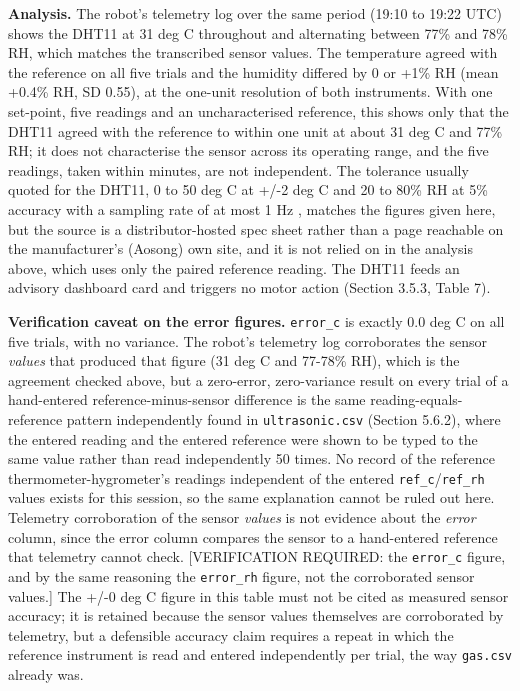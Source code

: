 \textbf{Analysis.} The robot's telemetry log over the same period (19:10 to 19:22 UTC) shows the DHT11 at 31 deg C throughout and alternating between 77\% and 78\% RH, which matches the transcribed sensor values. The temperature agreed with the reference on all five trials and the humidity differed by 0 or +1\% RH (mean +0.4\% RH, SD 0.55), at the one-unit resolution of both instruments. With one set-point, five readings and an uncharacterised reference, this shows only that the DHT11 agreed with the reference to within one unit at about 31 deg C and 77\% RH; it does not characterise the sensor across its operating range, and the five readings, taken within minutes, are not independent. The tolerance usually quoted for the DHT11, 0 to 50 deg C at +/-2 deg C and 20 to 80\% RH at 5\% accuracy with a sampling rate of at most 1 Hz \cite{adafruit_dht11}, matches the figures given here, but the source is a distributor-hosted spec sheet rather than a page reachable on the manufacturer's (Aosong) own site, and it is not relied on in the analysis above, which uses only the paired reference reading. The DHT11 feeds an advisory dashboard card and triggers no motor action (Section 3.5.3, Table 7).

\textbf{Verification caveat on the error figures.} \texttt{error\_c} is exactly 0.0 deg C on all five trials, with no variance. The robot's telemetry log corroborates the sensor \textit{values} that produced that figure (31 deg C and 77-78\% RH), which is the agreement checked above, but a zero-error, zero-variance result on every trial of a hand-entered reference-minus-sensor difference is the same reading-equals-reference pattern independently found in \texttt{ultrasonic.csv} (Section 5.6.2), where the entered reading and the entered reference were shown to be typed to the same value rather than read independently 50 times. No record of the reference thermometer-hygrometer's readings independent of the entered \texttt{ref\_c}/\texttt{ref\_rh} values exists for this session, so the same explanation cannot be ruled out here. Telemetry corroboration of the sensor \textit{values} is not evidence about the \textit{error} column, since the error column compares the sensor to a hand-entered reference that telemetry cannot check. [VERIFICATION REQUIRED: the \texttt{error\_c} figure, and by the same reasoning the \texttt{error\_rh} figure, not the corroborated sensor values.] The +/-0 deg C figure in this table must not be cited as measured sensor accuracy; it is retained because the sensor values themselves are corroborated by telemetry, but a defensible accuracy claim requires a repeat in which the reference instrument is read and entered independently per trial, the way \texttt{gas.csv} already was.

